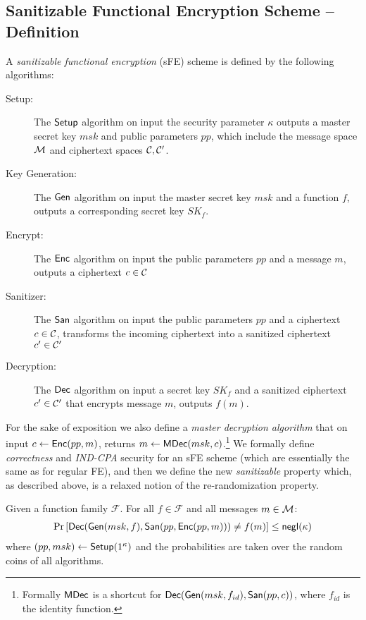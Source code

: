 \documentclass{llncs}
\begin{document}
\subsection{Sanitizable Functional Encryption Scheme -- Definition}\label{sec:sfe}
A \emph{sanitizable functional encryption} (sFE) scheme is defined by the following algorithms:
\begin{description}
\item[Setup:] The $\mathsf{Setup}$ algorithm on input the security parameter $\kappa$ outputs a master secret key $msk$ and public parameters $pp$, which include the message space $\mathcal{M}$ and ciphertext spaces $\mathcal{C},\mathcal{C}'$.

\item[Key Generation:] The $\mathsf{Gen}$ algorithm on input the master secret key $msk$ and a function $f$, outputs a corresponding secret key $SK_f$.

\item[Encrypt:] The $\mathsf{Enc}$ algorithm on input the public parameters $pp$ and a message $m$, outputs a ciphertext $c \in \mathcal{C}$

\item[Sanitizer:] The $\mathsf{San}$ algorithm on input the public parameters $pp$ and a ciphertext $c \in \mathcal{C}$, transforms the incoming ciphertext into a sanitized ciphertext $c'\in\mathcal{C}'$ 

\item[Decryption:] The $\mathsf{Dec}$ algorithm on input a secret key $SK_f$ and a sanitized ciphertext $c'\in\mathcal{C}'$ that encrypts message $m$, outputs $f(m)$.





\end{description}

For the sake of exposition we also define a \emph{master decryption algorithm} that on input $c\leftarrow\mathsf{Enc}(pp,m)$, returns $m \leftarrow \mathsf{MDec}(msk,c)$.\footnote{Formally $\mathsf{MDec}$ is a shortcut for $\mathsf{Dec}(\mathsf{Gen}(msk,f_{id}),\mathsf{San}(pp,c))$, where $f_{id}$ is the identity function.} We formally define \emph{correctness} and \emph{IND-CPA} security for an sFE scheme (which are essentially the same as for regular FE), and then we define the new \emph{sanitizable} property which, as described above, is a relaxed notion of the re-randomization property.

\begin{defi}
Given a function family $\mathcal{F}$. For all $f \in \mathcal{F}$ and all messages $m \in \mathcal{M}$:
	\begin{align*}
	\Pr \left[ \mathsf{Dec}( \mathsf{Gen}(msk,f), \mathsf{San}(pp,\mathsf{Enc}(pp,m))) \neq f(m) \right] \leq \mathsf{negl}(\kappa)
	\end{align*}
where $(pp,msk) \leftarrow \mathsf{Setup}(1^\kappa)$ and the probabilities are taken over the random coins of all algorithms.
\end{defi}
\end{document}
